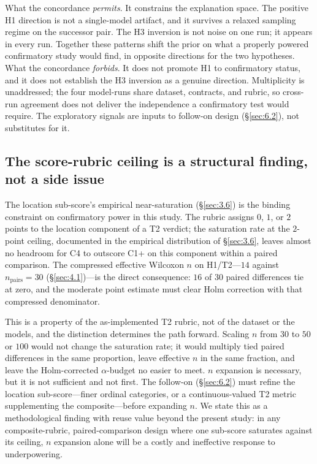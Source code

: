 \documentclass[11pt]{article}
\begin{document}
What the concordance \emph{permits}. It constrains the explanation
space. The positive H1 direction is not a single-model artifact,
and it survives a relaxed sampling regime on the successor pair.
The H3 inversion is not noise on one run; it appears in every
run. Together these patterns shift the prior on what a properly
powered confirmatory study would find, in opposite directions for
the two hypotheses. What the concordance \emph{forbids}. It does
not promote H1 to confirmatory status, and it does not establish
the H3 inversion as a genuine direction. Multiplicity is
unaddressed; the four model-runs share dataset, contracts, and
rubric, so cross-run agreement does not deliver the independence a
confirmatory test would require. The exploratory signals are
inputs to follow-on design (\S\ref{sec:6.2}), not substitutes for
it.

\subsection{The score-rubric ceiling is a structural finding, not a side issue}
\label{sec:5.3}
The location sub-score's empirical near-saturation
(\S\ref{sec:3.6}) is the binding constraint on confirmatory power
in this study. The rubric assigns $0$, $1$, or $2$ points to the
location component of a T2 verdict; the saturation rate at the
$2$-point ceiling, documented in the empirical distribution of
\S\ref{sec:3.6}, leaves almost no headroom for C4 to outscore C1+
on this component within a paired comparison. The compressed
effective Wilcoxon $n$ on H1/T2---$14$ against $n_{\text{pairs}} =
30$ (\S\ref{sec:4.1})---is the direct consequence: $16$ of $30$
paired differences tie at zero, and the moderate point estimate
must clear Holm correction with that compressed denominator.

This is a property of the as-implemented T2 rubric, not of the
dataset or the models, and the distinction determines the path
forward. Scaling $n$ from $30$ to $50$ or $100$ would not change
the saturation rate; it would multiply tied paired differences in
the same proportion, leave effective $n$ in the same fraction,
and leave the Holm-corrected $\alpha$-budget no easier to meet.
$n$ expansion is necessary, but it is not sufficient and not
first. The follow-on (\S\ref{sec:6.2}) must refine the location
sub-score---finer ordinal categories, or a continuous-valued T2
metric supplementing the composite---before expanding $n$. We
state this as a methodological finding with reuse value beyond
the present study: in any composite-rubric, paired-comparison
design where one sub-score saturates against its ceiling, $n$
expansion alone will be a costly and ineffective response to
underpowering.
\end{document}
